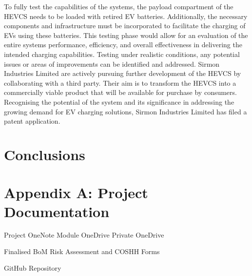 \documentclass [12pt]{article}
\begin{document}
To fully test the capabilities of the systems, the payload compartment of the HEVCS needs to be loaded with retired EV batteries. Additionally, the necessary components and infrastructure must be incorporated to facilitate the charging of EVs using these batteries. This testing phase would allow for an evaluation of the entire systems performance, efficiency, and overall effectiveness in delivering the intended charging capabilities. Testing under realistic conditions, any potential issues or areas of improvements can be identified and addressed.
Sirmon Industries Limited are actively pursuing further development of the HEVCS by collaborating with a third party. Their aim is to transform the HEVCS into a commercially viable product that will be available for purchase by consumers. Recognising the potential of the system and its significance in addressing the growing demand for EV charging solutions, Sirmon Industries Limited has filed a patent application.


\newpage
\section{Conclusions}

\newpage



\newpage
\appendix

\section{Appendix A: Project Documentation}

Project OneNote \cite{onenote}
Module OneDrive \cite{unidrive}
Private OneDrive \cite{privdrive}

Finalised BoM \cite{bom}
Risk Assessment and COSHH Forms \cite{RA}

GitHub Repository \cite{}
\end{document}
